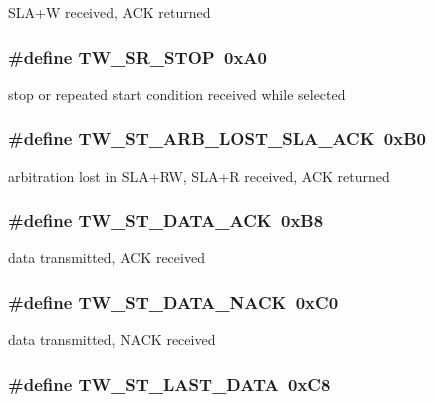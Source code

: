 SLA+W received, ACK returned \hypertarget{group__util__twi_ga98d2570f965790884cf1774e716ec629}{
\subsubsection[{TW\_\-SR\_\-STOP}]{\setlength{\rightskip}{0pt plus 5cm}\#define TW\_\-SR\_\-STOP~0xA0}}
\label{group__util__twi_ga98d2570f965790884cf1774e716ec629}
stop or repeated start condition received while selected \hypertarget{group__util__twi_ga1064659d0758206d43d69cd582d1f5da}{
\subsubsection[{TW\_\-ST\_\-ARB\_\-LOST\_\-SLA\_\-ACK}]{\setlength{\rightskip}{0pt plus 5cm}\#define TW\_\-ST\_\-ARB\_\-LOST\_\-SLA\_\-ACK~0xB0}}
\label{group__util__twi_ga1064659d0758206d43d69cd582d1f5da}
arbitration lost in SLA+RW, SLA+R received, ACK returned \hypertarget{group__util__twi_ga2de84bf7cbf1cd7ae43a6e0f0eeca719}{
\subsubsection[{TW\_\-ST\_\-DATA\_\-ACK}]{\setlength{\rightskip}{0pt plus 5cm}\#define TW\_\-ST\_\-DATA\_\-ACK~0xB8}}
\label{group__util__twi_ga2de84bf7cbf1cd7ae43a6e0f0eeca719}
data transmitted, ACK received \hypertarget{group__util__twi_gacc1837317b1d45e9bb49b8e83cfe6d42}{
\subsubsection[{TW\_\-ST\_\-DATA\_\-NACK}]{\setlength{\rightskip}{0pt plus 5cm}\#define TW\_\-ST\_\-DATA\_\-NACK~0xC0}}
\label{group__util__twi_gacc1837317b1d45e9bb49b8e83cfe6d42}
data transmitted, NACK received \hypertarget{group__util__twi_gaf92d03d0051d47f5b9375f0ef9293d64}{
\subsubsection[{TW\_\-ST\_\-LAST\_\-DATA}]{\setlength{\rightskip}{0pt plus 5cm}\#define TW\_\-ST\_\-LAST\_\-DATA~0xC8}}
